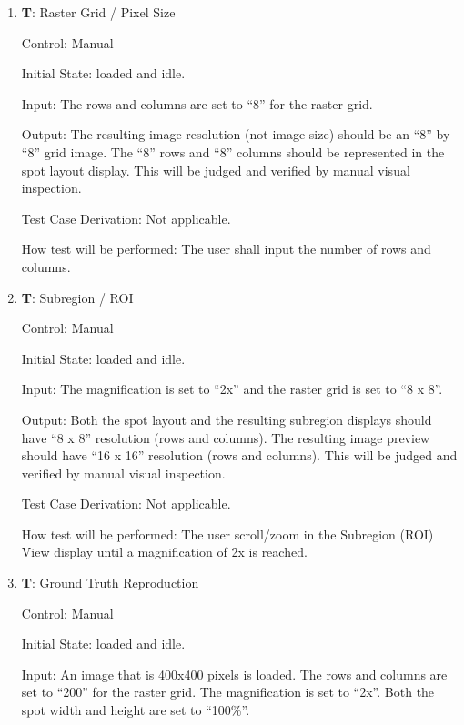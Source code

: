 \documentclass[12pt, titlepage]{article}
\newcounter{testnum} %
\begin{document}
\begin{enumerate}
    \item{\textbf{T\thetestnum \label{T_rasterGrid}}: Raster Grid / Pixel Size\\}

    Control: Manual
                
    Initial State: \progname{} loaded and idle.
              
    Input: The rows and columns are set to ``8'' for the raster grid.
              
    Output: The resulting image resolution (not image size) should be an ``8'' by ``8'' grid image.
      The ``8'' rows and ``8'' columns should be represented in the spot layout display.
      This will be judged and verified by manual visual inspection.

    Test Case Derivation: Not applicable.

    How test will be performed: The user shall input the number of rows and columns.

    \item{\textbf{T\thetestnum \label{T_subregion}}: Subregion / ROI\\}

    Control: Manual
                
    Initial State: \progname{} loaded and idle.
              
    Input: The magnification is set to ``2x'' and the raster grid is set to ``8 x 8''.
              
    Output: Both the spot layout and the resulting subregion displays should have ``8 x 8'' resolution (rows and columns). 
      The resulting image preview should have ``16 x 16'' resolution (rows and columns).
      This will be judged and verified by manual visual inspection.

    Test Case Derivation: Not applicable.

    How test will be performed: The user scroll/zoom in the Subregion (ROI) View display until a magnification of 2x is reached.

    \item{\textbf{T\thetestnum \label{T_reproduceGT}}: Ground Truth Reproduction\\}

    Control: Manual
                
    Initial State: \progname{} loaded and idle.
              
    Input: An image that is 400x400 pixels is loaded.
      The rows and columns are set to ``200'' for the raster grid.
      The magnification is set to ``2x''.
      Both the spot width and height are set to ``100\%''.
              

\end{enumerate}
\end{document}
